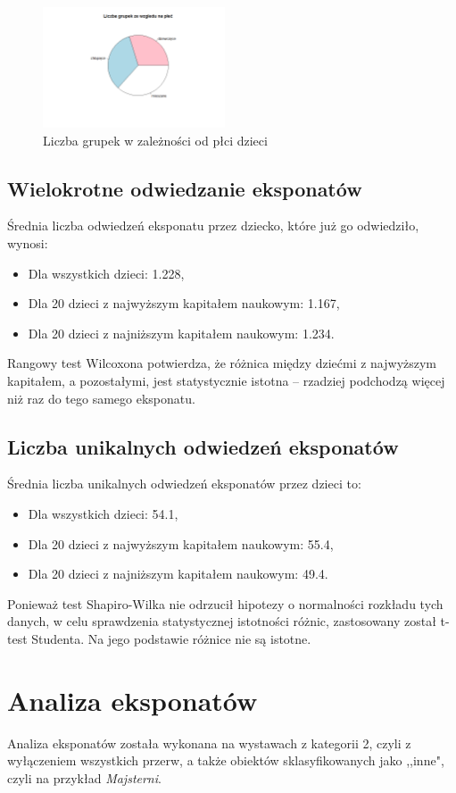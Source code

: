 \documentclass[conference]{IEEEtran}
\begin{document}
\begin{figure}[H]
\includegraphics[width=0.48\textwidth]{grupki_plec.png}
\caption{Liczba grupek w zależności od płci dzieci}


\label{grupki_plec}
\end{figure}


\subsection{Wielokrotne odwiedzanie eksponatów}
Średnia liczba odwiedzeń eksponatu przez dziecko, które już go odwiedziło, wynosi:
\begin{itemize}
\item Dla wszystkich dzieci: 1.228,
\item Dla 20 dzieci z najwyższym kapitałem naukowym: 1.167,
\item Dla 20 dzieci z najniższym kapitałem naukowym: 1.234.
\end{itemize}
Rangowy test Wilcoxona potwierdza, że różnica między dziećmi z najwyższym kapitałem, a pozostałymi, jest statystycznie istotna -- rzadziej podchodzą więcej niż raz do tego samego eksponatu.
\subsection{Liczba unikalnych odwiedzeń eksponatów}
Średnia liczba unikalnych odwiedzeń eksponatów przez dzieci to:
\begin{itemize}
\item Dla wszystkich dzieci: 54.1,
\item Dla 20 dzieci z najwyższym kapitałem naukowym: 55.4,
\item Dla 20 dzieci z najniższym kapitałem naukowym: 49.4.
\end{itemize}
Ponieważ test Shapiro-Wilka nie odrzucił hipotezy o normalności rozkładu tych danych, w celu sprawdzenia statystycznej istotności różnic, zastosowany został t-test Studenta. Na jego podstawie różnice nie są istotne.

\section{Analiza eksponatów}
Analiza eksponatów została wykonana na wystawach z kategorii 2, czyli z wyłączeniem wszystkich przerw, a także obiektów sklasyfikowanych jako ,,inne", czyli na przykład \textit{Majsterni}.
\end{document}
